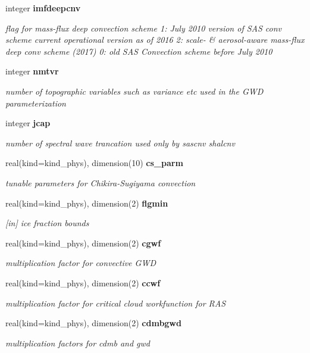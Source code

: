 \begin{DoxyCompactItemize}
integer \textbf{ imfdeepcnv}
\begin{DoxyCompactList}\small\item\em flag for mass-\/flux deep convection scheme 1\+: July 2010 version of S\+AS conv scheme current operational version as of 2016 2\+: scale-\/ \& aerosol-\/aware mass-\/flux deep conv scheme (2017) 0\+: old S\+AS Convection scheme before July 2010 \end{DoxyCompactList}\item 
integer \textbf{ nmtvr}
\begin{DoxyCompactList}\small\item\em number of topographic variables such as variance etc used in the G\+WD parameterization \end{DoxyCompactList}\item 
integer \textbf{ jcap}
\begin{DoxyCompactList}\small\item\em number of spectral wave trancation used only by sascnv shalcnv \end{DoxyCompactList}\item 
real(kind=kind\+\_\+phys), dimension(10) \textbf{ cs\+\_\+parm}
\begin{DoxyCompactList}\small\item\em tunable parameters for Chikira-\/\+Sugiyama convection \end{DoxyCompactList}\item 
real(kind=kind\+\_\+phys), dimension(2) \textbf{ flgmin}
\begin{DoxyCompactList}\small\item\em [in] ice fraction bounds \end{DoxyCompactList}\item 
real(kind=kind\+\_\+phys), dimension(2) \textbf{ cgwf}
\begin{DoxyCompactList}\small\item\em multiplication factor for convective G\+WD \end{DoxyCompactList}\item 
real(kind=kind\+\_\+phys), dimension(2) \textbf{ ccwf}
\begin{DoxyCompactList}\small\item\em multiplication factor for critical cloud workfunction for R\+AS \end{DoxyCompactList}\item 
real(kind=kind\+\_\+phys), dimension(2) \textbf{ cdmbgwd}
\begin{DoxyCompactList}\small\item\em multiplication factors for cdmb and gwd \end{DoxyCompactList}\item 

\end{DoxyCompactItemize}
